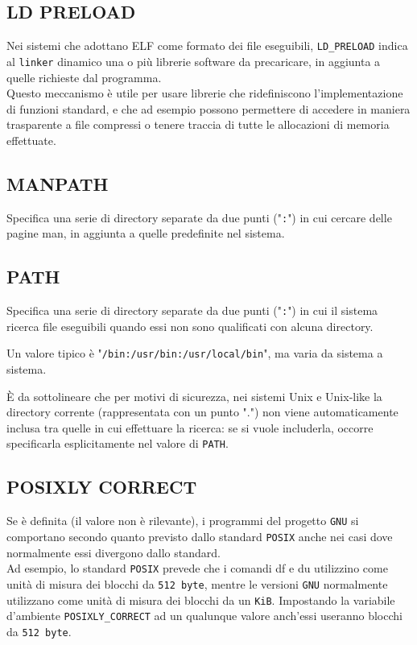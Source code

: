 \subsection{LD PRELOAD}
Nei sistemi che adottano ELF come formato dei file eseguibili, \verb*|LD_PRELOAD| indica al \verb*|linker| dinamico una o più librerie software da precaricare, in aggiunta a quelle richieste dal programma.\\
Questo meccanismo è utile per usare librerie che ridefiniscono l'implementazione di funzioni standard, e che ad esempio possono permettere di accedere in maniera trasparente a file compressi o tenere traccia di tutte le allocazioni di memoria effettuate. 

\subsection{MANPATH}
Specifica una serie di directory separate da due punti ("\verb|:|") in cui cercare delle pagine man, in aggiunta a quelle predefinite nel sistema. 

\subsection{PATH}
Specifica una serie di directory separate da due punti ("\verb*|:|") in cui il sistema ricerca file eseguibili quando essi non sono qualificati con alcuna directory.

Un valore tipico è "\verb*|/bin:/usr/bin:/usr/local/bin|", ma varia da sistema a sistema.

È da sottolineare che per motivi di sicurezza, nei sistemi Unix e Unix-like la directory corrente (rappresentata con un punto ".") non viene automaticamente inclusa tra quelle in cui effettuare la ricerca: se si vuole includerla, occorre specificarla esplicitamente nel valore di \verb*|PATH|. 

\subsection{POSIXLY CORRECT}

Se è definita (il valore non è rilevante), i programmi del progetto \verb*|GNU| si comportano secondo quanto previsto dallo standard \verb*|POSIX| anche nei casi dove normalmente essi divergono dallo standard.\\
Ad esempio, lo standard \verb*|POSIX| prevede che i comandi df e du utilizzino come unità di misura dei blocchi da \verb*|512 byte|, mentre le versioni \verb*|GNU| normalmente utilizzano come unità di misura dei blocchi da un \verb*|KiB|. Impostando la variabile d'ambiente \verb*|POSIXLY_CORRECT| ad un qualunque valore anch'essi useranno blocchi da \verb*|512 byte|.

